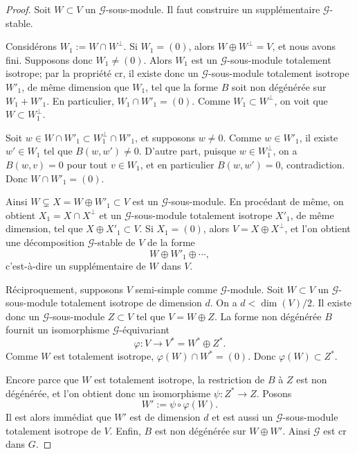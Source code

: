 \documentclass[11pt]{article}
\begin{document}
\begin{proof}
Soit \(W\subset V\) un \(\mathcal G\)-sous-module. Il faut construire un supplémentaire
\(\mathcal G\)-stable.

Considérons \(W_1:=W\cap W^\perp\). Si \(W_1=(0)\), alors
\(W\oplus W^\perp=V\), et nous avons fini. Supposons donc \(W_1\ne(0)\). Alors \(W_1\)
est un \(\mathcal G\)-sous-module totalement isotrope; par la propriété \(\mathrm{cr}\),
il existe donc un \(\mathcal G\)-sous-module totalement isotrope \(W'_1\), de même
dimension que \(W_1\), tel que la forme \(B\) soit non dégénérée sur \(W_1+W'_1\). En
particulier, \(W_1\cap W'_1=(0)\). Comme \(W_1\subset W^\perp\), on voit que
\(W\subset W_1^\perp\).

Soit \(w\in W\cap W'_1\subset W_1^\perp\cap W'_1\), et supposons \(w\ne0\). Comme
\(w\in W'_1\), il existe \(w'\in W_1\) tel que \(B(w,w')\ne0\). D'autre part, puisque
\(w\in W_1^\perp\), on a \(B(w,v)=0\) pour tout \(v\in W_1\), et en particulier
\(B(w,w')=0\), contradiction. Donc \(W\cap W'_1=(0)\).

Ainsi \(W\subsetneq X=W\oplus W'_1\subset V\) est un \(\mathcal G\)-sous-module. En
procédant de même, on obtient \(X_1=X\cap X^\perp\) et un
\(\mathcal G\)-sous-module totalement isotrope \(X'_1\), de même dimension, tel que
\(X\oplus X'_1\subset V\). Si \(X_1=(0)\), alors \(V=X\oplus X^\perp\), et l'on obtient
une décomposition \(\mathcal G\)-stable de \(V\) de la forme
\[
  W\oplus W'_1\oplus\cdots,
\]
c'est-à-dire un supplémentaire de \(W\) dans \(V\).

Réciproquement, supposons \(V\) semi-simple comme \(\mathcal G\)-module. Soit
\(W\subset V\) un \(\mathcal G\)-sous-module totalement isotrope de dimension \(d\). On a
\(d<\dim(V)/2\). Il existe donc un \(\mathcal G\)-sous-module \(Z\subset V\) tel que
\(V=W\oplus Z\). La forme non dégénérée \(B\) fournit un isomorphisme
\(\mathcal G\)-équivariant
\[
  \varphi:V\longrightarrow V^*=W^*\oplus Z^*.
\]
Comme \(W\) est totalement isotrope, \(\varphi(W)\cap W^*=(0)\). Donc
\(\varphi(W)\subset Z^*\).

Encore parce que \(W\) est totalement isotrope, la restriction de \(B\) à \(Z\) est non
dégénérée, et l'on obtient donc un isomorphisme \(\psi:Z^*\to Z\). Posons
\[
  W':=\psi\circ\varphi(W).
\]
Il est alors immédiat que \(W'\) est de dimension \(d\) et est aussi un
\(\mathcal G\)-sous-module totalement isotrope de \(V\). Enfin, \(B\) est non dégénérée
sur \(W\oplus W'\). Ainsi \(\mathcal G\) est \(\mathrm{cr}\) dans \(G\).
\end{proof}
\end{document}

